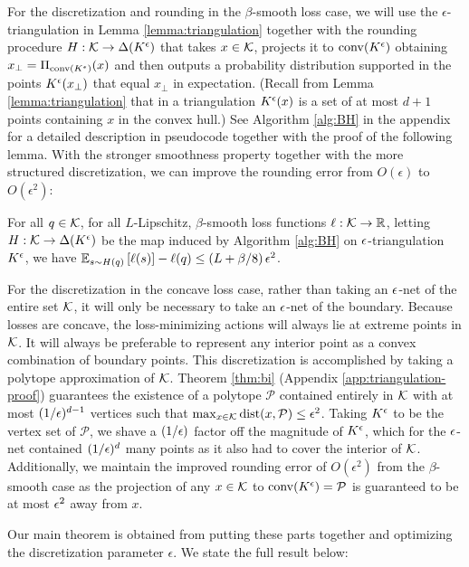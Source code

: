 \documentclass[final,12pt]{alt2025}
\begin{document}
For the discretization and rounding in the $\beta$-smooth loss case, we will use the $\epsilon$-triangulation in Lemma \ref{lemma:triangulation} together with the rounding procedure $H: \mathcal{K} \to \Delta(K^{\epsilon})$ that takes $x \in \mathcal{K}$, projects it to $\mathrm{conv}(K^{\epsilon})$ obtaining $x_\perp = \Pi_{\mathrm{conv}(K^{\epsilon})}(x)$ and then outputs a probability distribution supported in the points $K^{\epsilon}(x_\perp)$ that equal $x_\perp$ in expectation. (Recall from Lemma \ref{lemma:triangulation} that in a triangulation $K^{\epsilon}(x)$ is a set of at most $d+1$ points containing $x$ in the convex hull.) See Algorithm \ref{alg:BH} in the appendix for a detailed description in pseudocode together with the proof of the following lemma. With the stronger smoothness property together with the more structured discretization, we can improve the rounding error from $O(\epsilon)$ to $O(\epsilon^2)$:

\begin{lemma}\label{lemma:BH}
    For all $q \in \mathcal{K}$, for all $L$-Lipschitz, $\beta$-smooth loss functions $\ell: \mathcal{K} \to \mathbb{R}$, letting $H: \mathcal{K} \to \Delta(K^{\epsilon})$ be the map induced by Algorithm \ref{alg:BH} on $\epsilon$-triangulation $K^{\epsilon}$, we have
$\mathbb{E}_{s \sim H(q)}\left[\ell(s)\right] - \ell(q) \leq \left(L + \beta/8\right)\epsilon^2$.
\end{lemma}

For the discretization in the concave loss case, rather than taking an $\epsilon$-net of the entire set $\mathcal{K}$, it will only be necessary to take an $\epsilon$-net of the boundary.  Because losses are concave, the loss-minimizing actions will always lie at extreme points in $\mathcal{K}$.  It will always be preferable to represent any interior point as a convex combination of boundary points.  This discretization is accomplished by taking a polytope approximation of $\mathcal{K}$.  Theorem \ref{thm:bi} (Appendix \ref{app:triangulation-proof}) guarantees the existence of a polytope $\mathcal{P}$ contained entirely in $\mathcal{K}$ with at most $(1/\epsilon)^{d-1}$ vertices such that $\max_{x \in \mathcal{K}} \text{dist}(x,\mathcal{P}) \leq \epsilon^2$.  Taking $K^{\epsilon}$ to be the vertex set of $\mathcal{P}$, we shave a $(1/\epsilon)$ factor off the magnitude of $K^{\epsilon}$, which for the $\epsilon$-net contained $(1/\epsilon)^d$ many points as it also had to cover the interior of $\mathcal{K}$.  Additionally, we maintain the  improved rounding error of $O(\epsilon^2)$ from the $\beta$-smooth case as the projection of any $x \in \mathcal{K}$ to $\mathrm{conv}(K^{\epsilon}) = \mathcal{P}$ is guaranteed to be at most $\epsilon^2$ away from $x$.

Our main theorem is obtained from putting these parts together and optimizing the discretization parameter $\epsilon$. We state the full result below:
\end{document}
